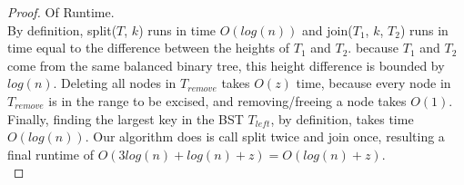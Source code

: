 \documentclass{article}
\theoremstyle{casestyle}
\begin{document}
\begin{proof} Of Runtime.\\
  By definition, split($T$, $k$) runs in time $O(log(n))$ and join($T_1$, $k$, $T_2$) runs in time equal to the difference between the heights of $T_1$ and $T_2$. because $T_1$ and $T_2$ come from the same balanced binary tree, this height difference is bounded by $log(n)$. Deleting all nodes in $T_{remove}$ takes $O(z)$ time, because every node in $T_{remove}$ is in the range to be excised, and removing/freeing a node takes $O(1)$. Finally, finding the largest key in the BST $T_{left}$, by definition, takes time $O(log(n))$. Our algorithm does is call split twice and join once, resulting a final runtime of $O(3log(n) + log(n) + z) = O(log(n) + z)$.\\

\end{proof}

\newpage
\end{document}
